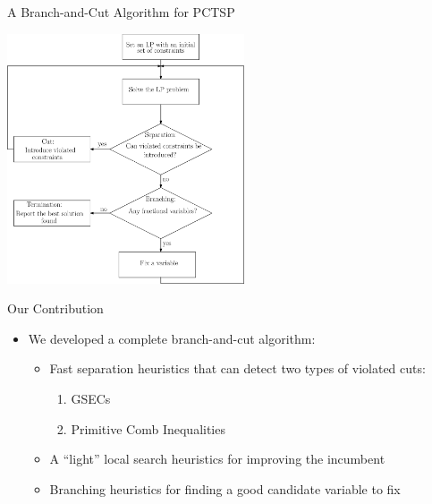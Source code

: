 \documentclass[10pt]{beamer}
\begin{document}
\begin{frame}{A Branch-and-Cut Algorithm for PCTSP}
\begin{center}
        \includegraphics[width=7cm]{Branch_and_Cut.eps} 
\end{center}
\end{frame}

\begin{frame}{Our Contribution}
\begin{itemize}
    \item<1-> We developed a complete branch-and-cut algorithm:
    \begin{itemize}
        \item<2-> Fast separation heuristics that can detect two types of violated cuts:
        \begin{enumerate}
            \item<3-> GSECs
            \item<4-> Primitive Comb Inequalities
        \end{enumerate}
        \item<5-> A ``light'' local search heuristics for improving the incumbent
        \item<6-> Branching heuristics for finding a good candidate variable to fix
    \end{itemize}
\end{itemize}
\end{frame}
\end{document}
